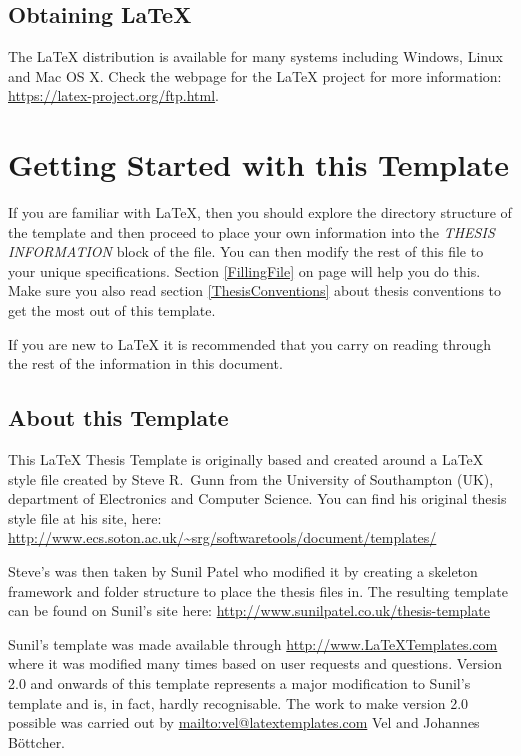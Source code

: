 \subsection{Obtaining \LaTeX{}}
 
The \LaTeX{} distribution is available for many systems including Windows, Linux and Mac OS X. Check the webpage for the \LaTeX{} project for more information: \url{https://latex-project.org/ftp.html}.


\section{Getting Started with this Template}

If you are familiar with \LaTeX{}, then you should explore the directory structure of the template and then proceed to place your own information into the \emph{THESIS INFORMATION} block of the  file. You can then modify the rest of this file to your unique specifications. Section \ref{FillingFile} on page \pageref{FillingFile} will help you do this. Make sure you also read section \ref{ThesisConventions} about thesis conventions to get the most out of this template.

If you are new to \LaTeX{} it is recommended that you carry on reading through the rest of the information in this document.

\subsection{About this Template}

This \LaTeX{} Thesis Template is originally based and created around a \LaTeX{} style file created by Steve R.\ Gunn from the University of Southampton (UK), department of Electronics and Computer Science. You can find his original thesis style file at his site, here:
\url{http://www.ecs.soton.ac.uk/~srg/softwaretools/document/templates/}

Steve's  was then taken by Sunil Patel who modified it by creating a skeleton framework and folder structure to place the thesis files in. The resulting template can be found on Sunil's site here:
\url{http://www.sunilpatel.co.uk/thesis-template}

Sunil's template was made available through \url{http://www.LaTeXTemplates.com} where it was modified many times based on user requests and questions. Version 2.0 and onwards of this template represents a major modification to Sunil's template and is, in fact, hardly recognisable. The work to make version 2.0 possible was carried out by \url{mailto:vel@latextemplates.com} {Vel} and Johannes Böttcher.

